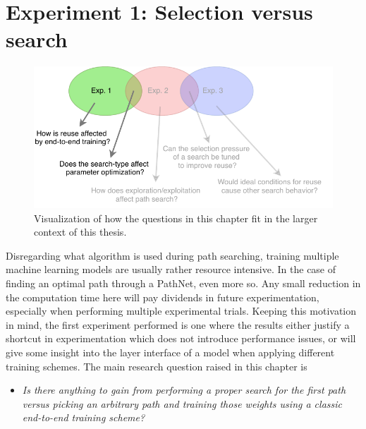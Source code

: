 \chapter{Experiment 1: Selection versus search}
\label{exp1}

\begin{figure}[hb]
    \includegraphics[width=\textwidth]{Chapters/4.Experiments/exp1/figures/exp1.pdf}
    \caption[Experiment focus]{Visualization of how the questions in this chapter fit in the larger context of this thesis.}
    \label{fig:exp1.questions}
\end{figure}

Disregarding what algorithm is used during path searching, training multiple machine learning models are usually rather resource intensive. In the case of finding an optimal path through a PathNet, even more so. Any small reduction in the computation time here will pay dividends in future experimentation, especially when performing multiple experimental trials. Keeping this motivation in mind, the first experiment performed is one where the results either justify a shortcut in experimentation which does not introduce performance issues, or will give some insight into the layer interface of a model when applying different training schemes.
\newline\newline
The main research question raised in this chapter is
\begin{itemize}
    \item \emph{Is there anything to gain from performing a proper search for the first path versus picking an arbitrary path and training those weights using a classic end-to-end training scheme?}
\end{itemize}


